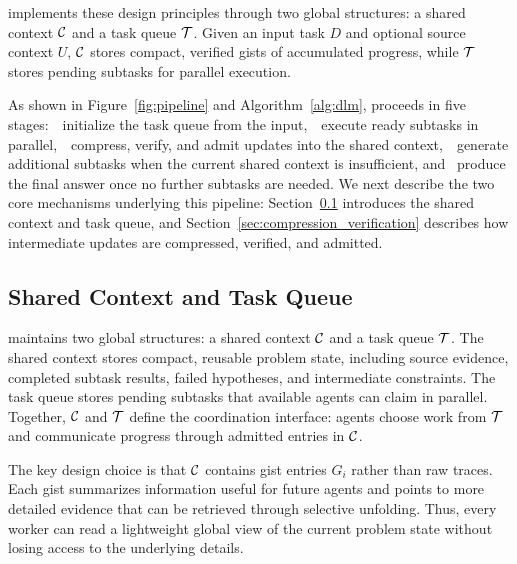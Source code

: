 \toolName{} implements these design principles through two global structures: a shared context $\mathcal{C}$ and a task queue $\mathcal{T}$. Given an input task $D$ and optional source context $U$, $\mathcal{C}$ stores compact, verified gists of accumulated progress, while $\mathcal{T}$ stores pending subtasks for parallel execution.

As shown in Figure~\ref{fig:pipeline} and Algorithm~\ref{alg:dlm}, \toolName{} proceeds in five stages\mbox{: }~initialize the task queue from the input\mbox{, }~execute ready subtasks in parallel\mbox{, }~compress, verify, and admit updates into the shared context\mbox{, }~generate additional subtasks when the current shared context is insufficient, \mbox{and } produce the final answer once no further subtasks are needed. We next describe the two core mechanisms underlying this pipeline: Section~\ref{sec:shared_context} introduces the shared context and task queue, and Section~\ref{sec:compression_verification} describes how intermediate updates are compressed, verified, and admitted.



\subsection{Shared Context and Task Queue}
\label{sec:shared_context}
\toolName{} maintains two global structures: a shared context $\mathcal{C}$ and a task queue $\mathcal{T}$. The shared context stores compact, reusable problem state, including source evidence, completed subtask results, failed hypotheses, and intermediate constraints. The task queue stores pending subtasks that available agents can claim in parallel. Together, $\mathcal{C}$ and $\mathcal{T}$ define the coordination interface: agents choose work from $\mathcal{T}$ and communicate progress through admitted entries in $\mathcal{C}$.

The key design choice is that $\mathcal{C}$ contains gist entries $G_i$ rather than raw traces. Each gist summarizes information useful for future agents and points to more detailed evidence that can be retrieved through selective unfolding. Thus, every worker can read a lightweight global view of the current problem state without losing access to the underlying details.

